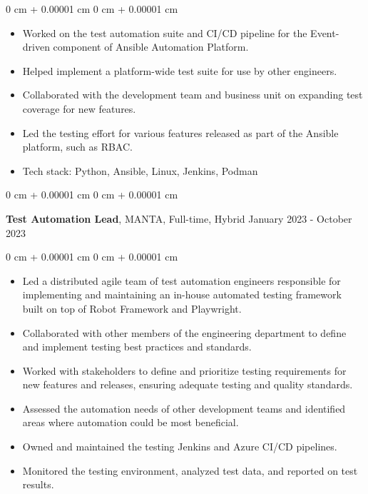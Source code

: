 \documentclass[10pt, letterpaper]{article}
\newenvironment{highlights}{
    \begin{itemize}[
        topsep=0.10 cm,
        parsep=0.10 cm,
        partopsep=0pt,
        itemsep=0pt,
        leftmargin=0 cm + 10pt
    ]
}{
    \end{itemize}
} %
\newenvironment{onecolentry}{
    \begin{adjustwidth}{
        0 cm + 0.00001 cm
    }{
        0 cm + 0.00001 cm
    }
}{
    \end{adjustwidth}
} %
\newenvironment{twocolentry}[2][]{
    \onecolentry
    \def\secondColumn{#2}
    \setcolumnwidth{\fill, 4.5 cm}
    \begin{paracol}{2}
}{
    \switchcolumn \raggedleft \secondColumn
    \end{paracol}
    \endonecolentry
} %
\begin{document}
        \begin{onecolentry}
            \begin{highlights}
                \item Worked on the test automation suite and CI/CD pipeline for the Event-driven component of Ansible Automation Platform.
                \item Helped implement a platform-wide test suite for use by other engineers.
                \item Collaborated with the development team and business unit on expanding test coverage for new features.
                \item Led the testing effort for various features released as part of the Ansible platform, such as RBAC.
                \item Tech stack: Python, Ansible, Linux, Jenkins, Podman
            \end{highlights}
        \end{onecolentry}

        \vspace{0.2 cm}

        \begin{twocolentry}{
            January 2023 - October 2023
        }
            \textbf{Test Automation Lead}, MANTA, Full-time, Hybrid\end{twocolentry}

        \vspace{0.10 cm}
        \begin{onecolentry}
            \begin{highlights}
                \item Led a distributed agile team of test automation engineers responsible for implementing and maintaining an in-house automated testing framework built on top of Robot Framework and Playwright.
                \item Collaborated with other members of the engineering department to define and implement testing best practices and standards.
                \item Worked with stakeholders to define and prioritize testing requirements for new features and releases, ensuring adequate testing and quality standards.
                \item Assessed the automation needs of other development teams and identified areas where automation could be most beneficial.
                \item Owned and maintained the testing Jenkins and Azure CI/CD pipelines.
                \item Monitored the testing environment, analyzed test data, and reported on test results.
            \end{highlights}
        \end{onecolentry}
\end{document}
